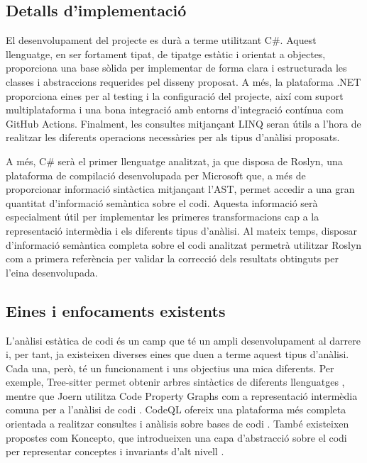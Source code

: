 \subsection*{Detalls d'implementació}
El desenvolupament del projecte es durà a terme utilitzant C\#. Aquest llenguatge, en ser fortament tipat, de tipatge estàtic i orientat a objectes, proporciona una base sòlida per implementar de forma clara i estructurada les classes i abstraccions requerides pel disseny proposat. A més, la plataforma .NET proporciona eines per al testing i la configuració del projecte, així com suport multiplataforma i una bona integració amb entorns d'integració contínua com GitHub Actions. Finalment, les consultes mitjançant LINQ seran útils a l'hora de realitzar les diferents operacions necessàries per als tipus d'anàlisi proposats.

A més, C\# serà el primer llenguatge analitzat, ja que disposa de Roslyn, una plataforma de compilació desenvolupada per Microsoft que, a més de proporcionar informació sintàctica mitjançant l'AST, permet accedir a una gran quantitat d'informació semàntica sobre el codi. Aquesta informació serà especialment útil per implementar les primeres transformacions cap a la representació intermèdia i els diferents tipus d'anàlisi. Al mateix temps, disposar d'informació semàntica completa sobre el codi analitzat permetrà utilitzar Roslyn com a primera referència per validar la correcció dels resultats obtinguts per l'eina desenvolupada.


\subsection*{Eines i enfocaments existents}
L'anàlisi estàtica de codi és un camp que té un ampli desenvolupament al darrere i, per tant, ja existeixen diverses eines que duen a terme aquest tipus d'anàlisi. Cada una, però, té un funcionament i uns objectius una mica diferents. Per exemple, Tree-sitter permet obtenir arbres sintàctics de diferents llenguatges \cite{tree_sitter}, mentre que Joern utilitza Code Property Graphs com a representació intermèdia comuna per a l'anàlisi de codi \cite{joern_cpg}. CodeQL ofereix una plataforma més completa orientada a realitzar consultes i anàlisis sobre bases de codi \cite{codeql}. També existeixen propostes com Koncepto, que introdueixen una capa d'abstracció sobre el codi per representar conceptes i invariants d'alt nivell \cite{koncepto}.


